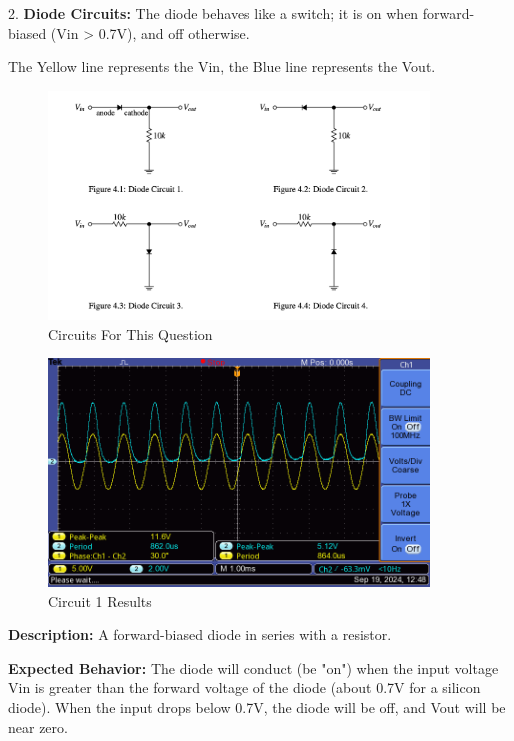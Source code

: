 \documentclass{article}
\begin{document}
\newline
\newline

2. \textbf{Diode Circuits: }The diode behaves like a switch; it is on when forward-biased (Vin > 0.7V), and off otherwise.

The Yellow line represents the Vin, the Blue line represents the Vout.

\begin{figure}[H]
    \centering
    \includegraphics[width=0.9\textwidth]{./img/other/Lab4_Circuits.png}
    \caption{Circuits For This Question}
    \label{fig:graph2}
\end{figure}

\begin{figure}[H]
    \centering
    \includegraphics[width=0.9\textwidth]{./img/Lab4_2_1.png}
    \caption{Circuit 1 Results}
    \label{fig:graph3}
\end{figure}

\textbf{Description:} A forward-biased diode in series with a resistor.

\textbf{Expected Behavior:} The diode will conduct (be "on") when the input voltage 
Vin is greater than the forward voltage of the diode 
(about 0.7V for a silicon diode). When the input drops below 0.7V, the diode 
will be off, and Vout will be near zero.
\end{document}
